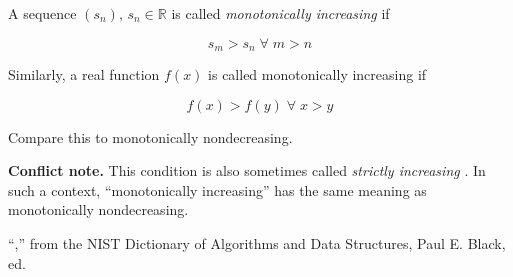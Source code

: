 \documentclass[12pt]{article}
\begin{document}
A sequence $(s_n)$, $s_n \in \mathbb{R} $ is called \emph{monotonically increasing} if 

$$ s_m > s_n \; \forall \; m > n $$

Similarly, a real function $f(x)$ is called monotonically increasing if 

$$ f(x) > f(y) \; \forall \; x > y $$

Compare this to monotonically nondecreasing.

\textbf{Conflict note.}  This condition is also sometimes called \emph{strictly increasing} \cite{NIST}.  In such a context, ``monotonically increasing'' has the same meaning as monotonically nondecreasing.

\begin{thebibliography}{3}
 ``,'' from the NIST Dictionary of Algorithms and Data Structures, Paul E. Black, ed.
\end{thebibliography}
\end{document}
